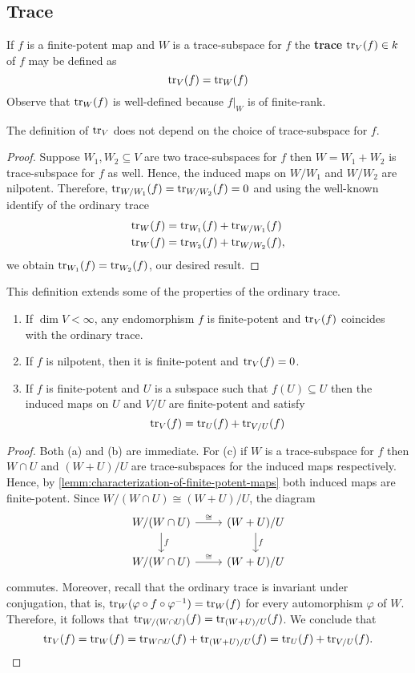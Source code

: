 \subsection{Trace}  If $f$ is a finite-potent map and $W$ is a trace-subspace for $f$ the \textbf{trace} $\operatorname{tr}_{V}(f)\in k$ of $f$ may be defined as
\[
	\operatorname{tr}_{V}(f) = \operatorname{tr}_{W}(f)
\]
Observe that $\operatorname{tr}_{W}(f)$ is well-defined because $f\lvert_{W}$ is of finite-rank. 
\begin{proposition}\label{prop:trace-does-not-depend-on-W}
	The definition of $\operatorname{tr}_{V}$ does not depend on the choice of trace-subspace for $f$.
\end{proposition}
\begin{proof}
	Suppose $W_{1}, W_{2} \subseteq V$ are two trace-subspaces for $f$ then $W = W_{1} + W_{2}$ is trace-subspace for $f$ as well. Hence, the induced maps on $W/W_{1}$ and $W/W_{2}$ are nilpotent. Therefore, $\operatorname{tr}_{W/W_{1}}(f) = \operatorname{tr}_{W/W_{2}}(f) = 0$ and using the well-known identify of the ordinary trace
\begin{align*}
	\operatorname{tr}_{W}(f) &= \operatorname{tr}_{W_{1}}(f) + \operatorname{tr}_{W/W_{1}}(f) \\
	\operatorname{tr}_{W}(f) &= \operatorname{tr}_{W_{2}}(f) + \operatorname{tr}_{W/W_{2}}(f),
\end{align*}
we obtain $\operatorname{tr}_{W_{1}}(f) = \operatorname{tr}_{W_{2}}(f)$, our desired result. 
\end{proof}
This definition extends some of the properties of the ordinary trace.
\begin{lemma}\label{lemm:properties-trace}
	\begin{enumerate}[label = (\alph*)]
		\item If $\dim V < \infty$, any endomorphism $f$ is finite-potent and $\operatorname{tr}_{V}(f)$ coincides with the ordinary trace.
		\item If $f$ is nilpotent, then it is finite-potent and $\operatorname{tr}_{V}(f) = 0$.
		\item If $f$ is finite-potent and $U$ is a subspace such that $f(U) \subseteq U$ then the induced maps on $U$ and $V/U$ are finite-potent and satisfy
		\[
		 	\operatorname{tr}_{V}(f) = \operatorname{tr}_{U}(f) + \operatorname{tr}_{V/U}(f)
		 \] 
	\end{enumerate}
\end{lemma}
\begin{proof}
	Both (a) and (b) are immediate. For (c) if $W$ is a trace-subspace for $f$ then $W\cap U$ and $(W + U)/U$ are trace-subspaces for the induced maps respectively. Hence, by \cref{lemm:characterization-of-finite-potent-maps} both induced maps are finite-potent. Since $W/(W\cap U) \cong (W+U)/U$, the diagram
	\[
		\begin{tikzcd}
			W/(W\cap U) \arrow[r, "\cong"] \arrow[d, "f"] & (W+U)/U \arrow[d, "f"] \\
			W/(W\cap U) \arrow[r, "\cong"] & (W+U)/U
		\end{tikzcd}
	\]
	commutes. Moreover, recall that the ordinary trace is invariant under conjugation, that is, $\operatorname{tr}_{W}(\varphi \circ f \circ \varphi^{-1}) = \operatorname{tr}_{W}(f)$ for every automorphism $\varphi$ of $W$. Therefore, it follows that $\operatorname{tr}_{W/(W\cap U)}(f) = \operatorname{tr}_{(W+U)/U}(f)$. We conclude that
	\[
	 	\operatorname{tr}_{V}(f) = \operatorname{tr}_{W}(f) = \operatorname{tr}_{W\cap U}(f) + \operatorname{tr}_{(W+U)/U}(f) = \operatorname{tr}_{U}(f) + \operatorname{tr}_{V/U}(f).
	\]
\end{proof}
